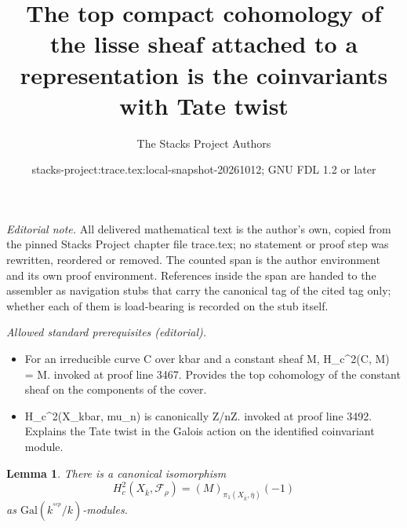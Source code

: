 \documentclass{stacks-project}
\title{The top compact cohomology of the lisse sheaf attached to a representation is the coinvariants with Tate twist}
\author{The Stacks Project Authors}
\date{stacks-project:trace.tex:local-snapshot-20261012; GNU FDL 1.2 or later}
\theoremstyle{plain}
\newtheorem{lemma}[subsection]{Lemma}
\theoremstyle{definition}
\theoremstyle{remark}
\numberwithin{equation}{subsection}
\begin{document}
\maketitle
\setcounter{subsection}{1}
\noindent\textit{Editorial note.} All delivered mathematical text is the author's own, copied from the pinned Stacks Project chapter file trace.tex; no statement or proof step was rewritten, reordered or removed. The counted span is the author environment and its own proof environment. References inside the span are handed to the assembler as navigation stubs that carry the canonical tag of the cited tag only; whether each of them is load-bearing is recorded on the stub itself.\par\medskip
\noindent\textit{Allowed standard prerequisites (editorial).}\begin{itemize}
\item For an irreducible curve C over kbar and a constant sheaf M, H\_c\textasciicircum{}2(C, M) = M. invoked at proof line 3467. Provides the top cohomology of the constant sheaf on the components of the cover.
\item H\_c\textasciicircum{}2(X\_kbar, mu\_n) is canonically Z/nZ. invoked at proof line 3492. Explains the Tate twist in the Galois action on the identified coinvariant module.
\end{itemize}\medskip
\begin{lemma}
\label{lemma-identify-h2c}
There is a canonical isomorphism
$$
H_c^2(X_{\overline{k}}, \mathcal{F}_\rho)=(M)_{\pi_1(X_{\overline{k}},
\overline\eta)}(-1)
$$
as $\text{Gal}(k^{^{sep}}/k)$-modules.
\end{lemma}
\end{document}
